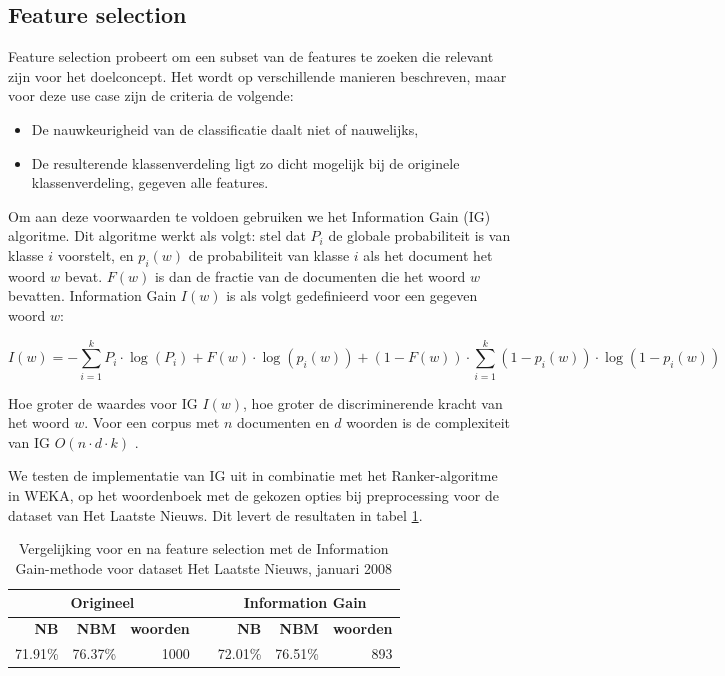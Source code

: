 \subsection{Feature selection}\label{IG}
Feature selection probeert om een subset van de features te zoeken die relevant zijn voor het doelconcept. Het wordt op verschillende manieren beschreven, maar voor deze use case zijn de criteria de volgende:
\begin{itemize}
\item De nauwkeurigheid van de classificatie daalt niet of nauwelijks,
\item De resulterende klassenverdeling ligt zo dicht mogelijk bij de originele klassenverdeling, gegeven alle features.
\end{itemize}

Om aan deze voorwaarden te voldoen gebruiken we het Information Gain (IG) algoritme. Dit algoritme werkt als volgt: stel dat $P_i$ de globale probabiliteit is van klasse $i$ voorstelt, en $p_{i}(w)$ de probabiliteit van klasse $i$ als het document het woord $w$ bevat. $F(w)$ is dan de fractie van de documenten die het woord $w$ bevatten. Information Gain $I(w)$ is als volgt gedefinieerd voor een gegeven woord  $w$:

\begin{equation}
I(w) = -\sum_{i=1}^{k}P_i\cdot\log{(P_i)} + F(w)\cdot\log(p_i(w)) + (1 - F(w))\cdot\sum_{i=1}^{k}(1-p_i(w))\cdot\log(1-p_i(w))
\end{equation}

Hoe groter de waardes voor IG $I(w)$, hoe groter de discriminerende kracht van het woord $w$. Voor een corpus met $n$ documenten en $d$ woorden is de complexiteit van IG $O(n \cdot d \cdot k)$ \cite{Forman2003}.

We testen de implementatie van IG uit  in combinatie met het Ranker-algoritme in WEKA, op het woordenboek met de gekozen opties bij preprocessing voor de dataset van Het Laatste Nieuws. Dit levert de resultaten in tabel \ref{tab:feature-selection}.

\begin{table}[htbp]
	\centering
	\caption{Vergelijking voor en na feature selection met de Information Gain-methode voor dataset Het Laatste Nieuws, januari 2008}
	\begin{tabular}{rrrrrrr}
		\toprule
		\multicolumn{3}{c}{\textbf{Origineel}} & \multicolumn{1}{c|}{\textbf{}} & \multicolumn{3}{c}{\textbf{Information Gain}} \\
		\midrule
		\textbf{NB} & \textbf{NBM} & \textbf{woorden}    &   \multicolumn{1}{c|}{}   & \textbf{NB} & \textbf{NBM} & \textbf{woorden} \\
		71.91\% & 76.37\% & 1000  &   \multicolumn{1}{c|}{}    & 72.01\% & 76.51\% & 893 \\
		\bottomrule
	\end{tabular}%
	\label{tab:feature-selection}%
\end{table}%

